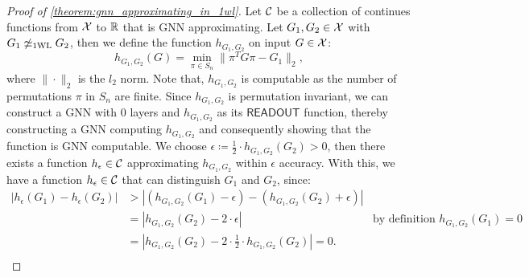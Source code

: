 \begin{proof}[Proof of \autoref{theorem:gnn_approximating_in_1wl}]
    Let $\mathcal{C}$ be a collection of continues functions from $\mathcal{X}$ to $\mathbb{R}$ that is GNN approximating. Let $G_1, G_2 \in \mathcal{X}$ with $G_1 \not\simeq_{\text{1WL}} G_2$, then we define the function $h_{G_1, G_2}$ on input $G \in \mathcal{X}$:
    \begin{equation*}
        h_{G_1, G_2}(G) = \min_{\pi \in S_n} \|\pi^T G \pi - G_1\|_2,
    \end{equation*} where $\|\cdot\|_2$ is the $l_2$ norm. Note that, $h_{G_1, G_2}$ is computable as the number of permutations $\pi$ in $S_n$ are finite. Since $h_{G_1, G_2}$ is permutation invariant, we can construct a GNN with $0$ layers and $h_{G_1, G_2}$ as its $\textsf{READOUT}$ function, thereby constructing a GNN computing $h_{G_1, G_2}$ and consequently showing that the function is GNN computable.
    We choose $\epsilon \coloneqq \frac{1}{2} \cdot h_{G_1, G_2}(G_2) > 0$, then there exists a function $h_\epsilon \in \mathcal{C}$ approximating $h_{G_1, G_2}$ within $\epsilon$ accuracy. With this, we have a function $h_\epsilon \in \mathcal{C}$ that can distinguish $G_1$ and $G_2$, since:
    \begin{align*}
        | h_\epsilon(G_1) - h_\epsilon(G_2)| &> | (h_{G_1, G_2}(G_1) - \epsilon) - (h_{G_1, G_2}(G_2) + \epsilon)|\\
        &= |h_{G_1, G_2}(G_2) -2 \cdot \epsilon| \quad&\text{by definition $h_{G_1, G_2}(G_1) = 0$}\\
        &= |h_{G_1, G_2}(G_2) -2 \cdot \frac{1}{2} \cdot h_{G_1, G_2}(G_2)| = 0.\\
    \end{align*}
\end{proof}